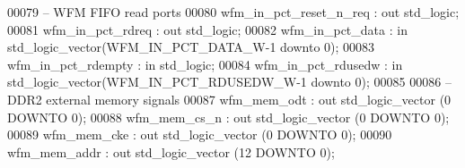 \begin{DoxyCode}
00079 \textcolor{keyword}{         -- WFM FIFO read ports}
00080       \textcolor{vhdlchar}{wfm_in_pct_reset_n_req}  \textcolor{vhdlchar}{:} \textcolor{keywordflow}{out}    \textcolor{comment}{std\_logic};
00081       \textcolor{vhdlchar}{wfm_in_pct_rdreq}        \textcolor{vhdlchar}{:} \textcolor{keywordflow}{out}    \textcolor{comment}{std\_logic};
00082       \textcolor{vhdlchar}{wfm_in_pct_data}         \textcolor{vhdlchar}{:} \textcolor{keywordflow}{in}     \textcolor{comment}{std\_logic\_vector}\textcolor{vhdlchar}{(}\textcolor{vhdlchar}{WFM_IN_PCT_DATA_W}\textcolor{vhdlchar}{-}\textcolor{vhdllogic}{}\textcolor{vhdllogic}{1} \textcolor{keywordflow}{downto} \textcolor{vhdllogic}{}\textcolor{vhdllogic}{0}\textcolor{vhdlchar}{)};
00083       \textcolor{vhdlchar}{wfm_in_pct_rdempty}      \textcolor{vhdlchar}{:} \textcolor{keywordflow}{in}     \textcolor{comment}{std\_logic};
00084       \textcolor{vhdlchar}{wfm_in_pct_rdusedw}      \textcolor{vhdlchar}{:} \textcolor{keywordflow}{in}     \textcolor{comment}{std\_logic\_vector}\textcolor{vhdlchar}{(}\textcolor{vhdlchar}{WFM_IN_PCT_RDUSEDW_W}\textcolor{vhdlchar}{-}\textcolor{vhdllogic}{}\textcolor{vhdllogic}{1} \textcolor{keywordflow}{downto} \textcolor{vhdllogic}{}\textcolor{vhdllogic}{0}\textcolor{vhdlchar}{)};
00085       
00086 \textcolor{keyword}{         --DDR2 external memory signals}
00087       \textcolor{vhdlchar}{wfm_mem_odt}             \textcolor{vhdlchar}{:} \textcolor{keywordflow}{out}    \textcolor{comment}{std\_logic\_vector} \textcolor{vhdlchar}{(}\textcolor{vhdllogic}{}\textcolor{vhdllogic}{0} \textcolor{keywordflow}{DOWNTO} \textcolor{vhdllogic}{}\textcolor{vhdllogic}{0}\textcolor{vhdlchar}{)};
00088       \textcolor{vhdlchar}{wfm_mem_cs_n}            \textcolor{vhdlchar}{:} \textcolor{keywordflow}{out}    \textcolor{comment}{std\_logic\_vector} \textcolor{vhdlchar}{(}\textcolor{vhdllogic}{}\textcolor{vhdllogic}{0} \textcolor{keywordflow}{DOWNTO} \textcolor{vhdllogic}{}\textcolor{vhdllogic}{0}\textcolor{vhdlchar}{)};
00089       \textcolor{vhdlchar}{wfm_mem_cke}             \textcolor{vhdlchar}{:} \textcolor{keywordflow}{out}    \textcolor{comment}{std\_logic\_vector} \textcolor{vhdlchar}{(}\textcolor{vhdllogic}{}\textcolor{vhdllogic}{0} \textcolor{keywordflow}{DOWNTO} \textcolor{vhdllogic}{}\textcolor{vhdllogic}{0}\textcolor{vhdlchar}{)};
00090       \textcolor{vhdlchar}{wfm_mem_addr}            \textcolor{vhdlchar}{:} \textcolor{keywordflow}{out}    \textcolor{comment}{std\_logic\_vector} \textcolor{vhdlchar}{(}\textcolor{vhdllogic}{}\textcolor{vhdllogic}{12} \textcolor{keywordflow}{DOWNTO} \textcolor{vhdllogic}{}\textcolor{vhdllogic}{0}\textcolor{vhdlchar}{)};

\end{DoxyCode}
